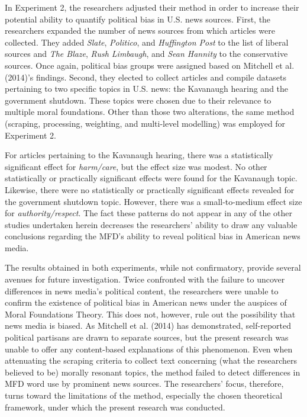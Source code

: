\documentclass[english,,man]{apa6}
\begin{document}
In Experiment 2, the researchers adjusted their method in order to increase their potential ability to quantify political bias in U.S. news sources. First, the researchers expanded the number of news sources from which articles were collected. They added \emph{Slate}, \emph{Politico}, and \emph{Huffington Post} to the list of liberal sources and \emph{The Blaze}, \emph{Rush Limbaugh}, and \emph{Sean Hannity} to the conservative sources. Once again, political bias groups were assigned based on Mitchell et al. (2014)'s findings. Second, they elected to collect articles and compile datasets pertaining to two specific topics in U.S. news: the Kavanaugh hearing and the government shutdown. These topics were chosen due to their relevance to multiple moral foundations. Other than those two alterations, the same method (scraping, processing, weighting, and multi-level modelling) was employed for Experiment 2.

For articles pertaining to the Kavanaugh hearing, there was a statistically significant effect for \emph{harm/care}, but the effect size was modest. No other statistically or practically significant effects were found for the Kavanaugh topic. Likewise, there were no statistically or practically significant effects revealed for the government shutdown topic. However, there was a small-to-medium effect size for \emph{authority/respect}. The fact these patterns do not appear in any of the other studies undertaken herein decreases the researchers' ability to draw any valuable conclusions regarding the MFD's ability to reveal political bias in American news media.

The results obtained in both experiments, while not confirmatory, provide several avenues for future investigation. Twice confronted with the failure to uncover differences in news media's political content, the researchers were unable to confirm the existence of political bias in American news under the auspices of Moral Foundations Theory. This does not, however, rule out the possibility that news media is biased. As Mitchell et al. (2014) has demonstrated, self-reported political partisans are drawn to separate sources, but the present research was unable to offer any content-based explanations of this phenomenon. Even when attenuating the scraping criteria to collect text concerning (what the researchers believed to be) morally resonant topics, the method failed to detect differences in MFD word use by prominent news sources. The researchers' focus, therefore, turns toward the limitations of the method, especially the chosen theoretical framework, under which the present research was conducted.
\end{document}

